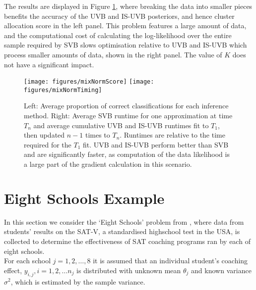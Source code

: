 \documentclass[
12pt, %
onehalfspacing, %
nohyperref, %
headsepline, %
chapterinoneline, %
]{MastersDoctoralThesis} %
\begin{document}
The results are displayed in Figure \ref{fig:UVBMMCResults}, where breaking the data into smaller pieces benefits the accuracy of the UVB and IS-UVB posteriors, and hence cluster allocation score in the left panel. This problem features a large amount of data, and the computational cost of calculating the log-likelihood over the entire sample required by SVB slows optimisation relative to UVB and IS-UVB which process smaller amounts of data, shown in the right panel. The value of $K$ does not have a significant impact.

\begin{figure}[htbp]
    \centering
    {{\texttt{[image: figures/mixNormScore]} }}%
    \qquad
    {{\texttt{[image: figures/mixNormTiming]} }}%
    \caption{Left: Average proportion of correct classifications for each inference method. Right: Average SVB runtime for one approximation at time $T_n$ and average cumulative UVB and IS-UVB runtimes fit to $T_1$, then updated $n-1$ times to $T_n$. Runtimes are relative to the time required for the $T_1$ fit.    
UVB and IS-UVB perform better than SVB and are significantly faster, as computation of the data likelihood is a large part of the gradient calculation in this scenario.}%
    \label{fig:UVBMMCResults}%
\end{figure}

\section{Eight Schools Example}

In this section we consider the `Eight Schools' problem from \citet{Gelman2014}, where data from students' results on the SAT-V, a standardised highschool test in the USA, is collected to determine the effectiveness of SAT coaching programs ran by each of eight schools. 
\\

For each school $j = 1, 2, \ldots, 8$ it is assumed that an individual student's coaching effect, $y_{i, j}, i = 1, 2, \dots n_j$ is distributed with unknown mean $\theta_j$ and known variance $\sigma^2$, which is estimated by the sample variance.
\\
\end{document}
